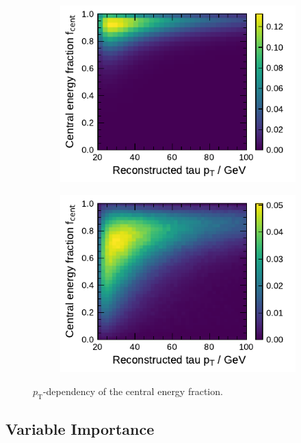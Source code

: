\begin{figure}[ht]
  \begin{subfigure}[t]{0.48\textwidth}
    \centering
    \includegraphics{./figures/bdt_perf/cent_frac_vs_pt_sig.pdf}
  \end{subfigure}\hfill
  \begin{subfigure}[t]{0.48\textwidth}
    \centering
    \includegraphics{./figures/bdt_perf/cent_frac_vs_pt_bkg.pdf}
  \end{subfigure}
    \caption{$p_\text{T}$-dependency of the central energy fraction.}
  \label{fig:bdt_pt_dependency}
\end{figure}


\subsection{Variable Importance}
\label{sec:bdt_var_importance}

